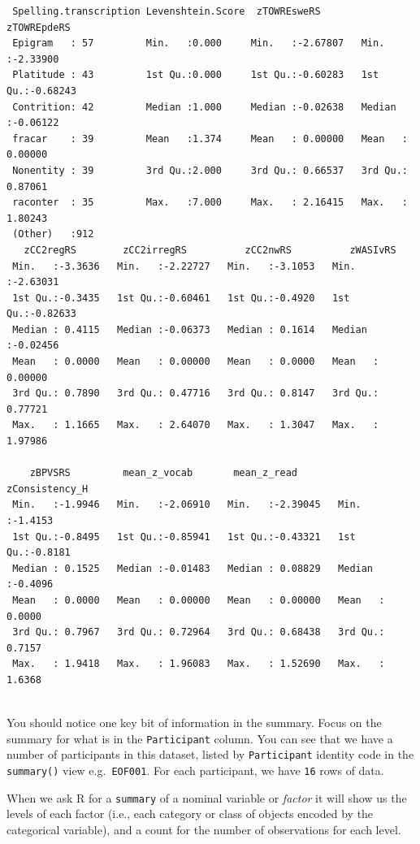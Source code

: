 \documentclass[
  letterpaper,
  DIV=11,
  numbers=noendperiod]{scrreprt}
\begin{document}
\begin{verbatim}
 Spelling.transcription Levenshtein.Score  zTOWREsweRS        zTOWREpdeRS      
 Epigram   : 57         Min.   :0.000     Min.   :-2.67807   Min.   :-2.33900  
 Platitude : 43         1st Qu.:0.000     1st Qu.:-0.60283   1st Qu.:-0.68243  
 Contrition: 42         Median :1.000     Median :-0.02638   Median :-0.06122  
 fracar    : 39         Mean   :1.374     Mean   : 0.00000   Mean   : 0.00000  
 Nonentity : 39         3rd Qu.:2.000     3rd Qu.: 0.66537   3rd Qu.: 0.87061  
 raconter  : 35         Max.   :7.000     Max.   : 2.16415   Max.   : 1.80243  
 (Other)   :912                                                                
   zCC2regRS        zCC2irregRS          zCC2nwRS          zWASIvRS       
 Min.   :-3.3636   Min.   :-2.22727   Min.   :-3.1053   Min.   :-2.63031  
 1st Qu.:-0.3435   1st Qu.:-0.60461   1st Qu.:-0.4920   1st Qu.:-0.82633  
 Median : 0.4115   Median :-0.06373   Median : 0.1614   Median :-0.02456  
 Mean   : 0.0000   Mean   : 0.00000   Mean   : 0.0000   Mean   : 0.00000  
 3rd Qu.: 0.7890   3rd Qu.: 0.47716   3rd Qu.: 0.8147   3rd Qu.: 0.77721  
 Max.   : 1.1665   Max.   : 2.64070   Max.   : 1.3047   Max.   : 1.97986  
                                                                          
    zBPVSRS         mean_z_vocab       mean_z_read       zConsistency_H   
 Min.   :-1.9946   Min.   :-2.06910   Min.   :-2.39045   Min.   :-1.4153  
 1st Qu.:-0.8495   1st Qu.:-0.85941   1st Qu.:-0.43321   1st Qu.:-0.8181  
 Median : 0.1525   Median :-0.01483   Median : 0.08829   Median :-0.4096  
 Mean   : 0.0000   Mean   : 0.00000   Mean   : 0.00000   Mean   : 0.0000  
 3rd Qu.: 0.7967   3rd Qu.: 0.72964   3rd Qu.: 0.68438   3rd Qu.: 0.7157  
 Max.   : 1.9418   Max.   : 1.96083   Max.   : 1.52690   Max.   : 1.6368  
                                                                          
\end{verbatim}

You should notice one key bit of information in the summary. Focus on
the summary for what is in the \texttt{Participant} column. You can see
that we have a number of participants in this dataset, listed by
\texttt{Participant} identity code in the \texttt{summary()} view
e.g.~\texttt{EOF001}. For each participant, we have \texttt{16} rows of
data.

When we ask R for a \texttt{summary} of a nominal variable or
\emph{factor} it will show us the levels of each factor (i.e., each
category or class of objects encoded by the categorical variable), and a
count for the number of observations for each level.
\end{document}
